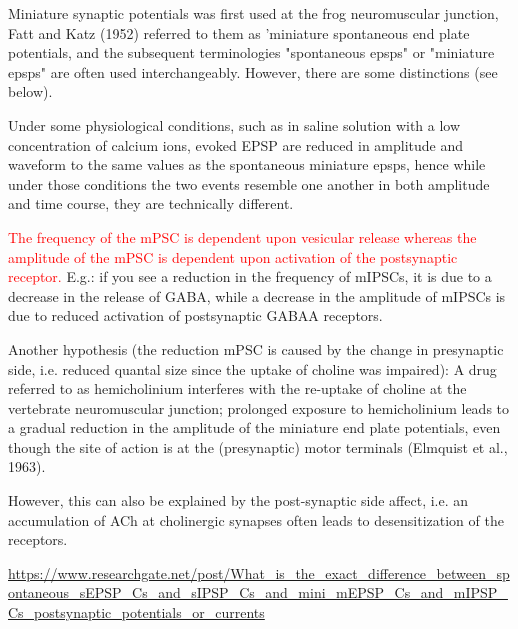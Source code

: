 \begin{mdframed}

Miniature synaptic potentials was first used at the frog neuromuscular junction,
Fatt and Katz (1952) referred to them as 'miniature spontaneous end plate
potentials, and the subsequent terminologies "spontaneous epsps" or "miniature
epsps" are often used interchangeably. However, there are some distinctions (see
below).


Under some physiological conditions, such as in saline solution with a low
concentration of calcium ions, evoked EPSP are reduced in amplitude and
waveform to the same values as the spontaneous miniature epsps, hence while
under those conditions the two events resemble one another in both amplitude and
time course, they are technically different.

\textcolor{red}{The frequency of the mPSC is dependent upon vesicular release
whereas the amplitude of the mPSC is dependent upon activation of the
postsynaptic receptor.} E.g.: if you see a reduction in the frequency of mIPSCs,
it is due to a decrease in the release of GABA, while a decrease in the
amplitude of mIPSCs is due to reduced activation of postsynaptic GABAA
receptors. 

Another hypothesis (the reduction mPSC is caused by the change in presynaptic
side, i.e. reduced quantal size since the uptake of choline was impaired): A
drug referred to as hemicholinium interferes with the re-uptake of choline at
the vertebrate neuromuscular junction; prolonged exposure to hemicholinium leads
to a gradual reduction in the amplitude of the miniature end plate potentials,
even though the site of action is at the (presynaptic) motor terminals (Elmquist
et al., 1963).

However, this can also be explained by the post-synaptic side affect, i.e. an
accumulation of ACh at cholinergic synapses often leads to desensitization of
the receptors.


\url{https://www.researchgate.net/post/What_is_the_exact_difference_between_spontaneous_sEPSP_Cs_and_sIPSP_Cs_and_mini_mEPSP_Cs_and_mIPSP_Cs_postsynaptic_potentials_or_currents}
\end{mdframed}


